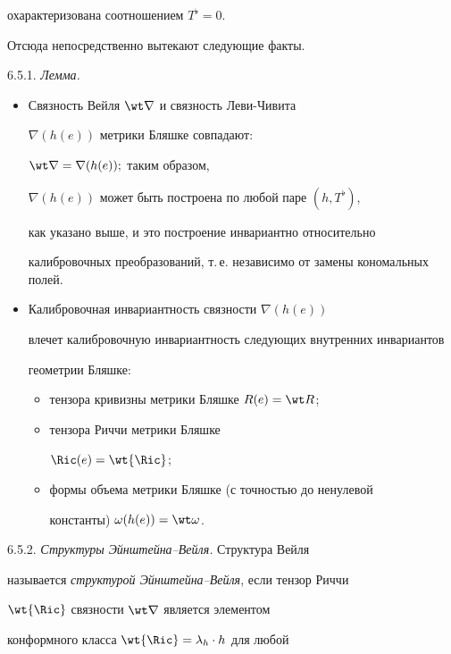 охарактеризована соотношением $T^{\flat}= 0$.

Отсюда непосредственно вытекают следующие факты.

\smallskip



6.5.1. {\it Лемма.}

\begin{itemize}

\item[(i)] Связность Вейля $\wt \nabla$ и связность Леви-Чивита

$\nabla (h(e))$ метрики Бляшке совпадают:

$\wt \nabla = \nabla (h(e));$ таким образом,

$\nabla (h(e))$ может быть построена по любой паре $(h, T^{\flat})$,

как указано выше, и это построение инвариантно относительно

калибровочных преобразований, т.\,е. независимо от замены кономальных полей.

\item [(ii)] Калибровочная инвариантность связности $\nabla (h(e))$

влечет калибровочную инвариантность следующих внутренних инвариантов

геометрии Бляшке:

\begin{itemize}

\item[(a)] тензора кривизны метрики Бляшке $R(e) = \wt R$;

\item[(b)] тензора Риччи метрики Бляшке

$\Ric(e) = \wt {\Ric}$;

\item[(c)] формы объема метрики Бляшке (с точностью до ненулевой

константы) $\omega(h(e)) = \wt \omega$.

\end{itemize}

\end{itemize}



6.5.2. {\it Структуры Эйнштейна--Вейля.} Структура Вейля

называется {\it структурой Эйн\-штей\-на--Вейля}, если тензор Риччи

$\wt {\Ric}$ связности $\wt \nabla$ является элементом

конформного класса $\wt {\Ric} = \lambda_h \cdot h$ для любой

